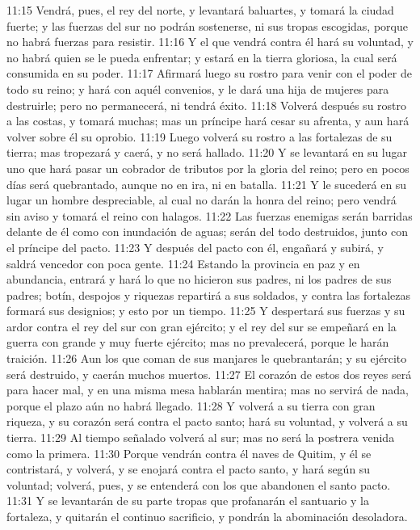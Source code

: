 11:15 Vendrá, pues, el rey del norte, y levantará baluartes, y tomará la ciudad fuerte; y las fuerzas del sur no podrán sostenerse, ni sus tropas escogidas, porque no habrá fuerzas para resistir.  
11:16 Y el que vendrá contra él hará su voluntad, y no habrá quien se le pueda enfrentar; y estará en la tierra gloriosa, la cual será consumida en su poder.  
11:17 Afirmará luego su rostro para venir con el poder de todo su reino; y hará con aquél convenios, y le dará una hija de mujeres para destruirle; pero no permanecerá, ni tendrá éxito.  
11:18 Volverá después su rostro a las costas, y tomará muchas; mas un príncipe hará cesar su afrenta, y aun hará volver sobre él su oprobio.  
11:19 Luego volverá su rostro a las fortalezas de su tierra; mas tropezará y caerá, y no será hallado.  
11:20 Y se levantará en su lugar uno que hará pasar un cobrador de tributos por la gloria del reino; pero en pocos días será quebrantado, aunque no en ira, ni en batalla.  
11:21 Y le sucederá en su lugar un hombre despreciable, al cual no darán la honra del reino; pero vendrá sin aviso y tomará el reino con halagos.  
11:22 Las fuerzas enemigas serán barridas delante de él como con inundación de aguas; serán del todo destruidos, junto con el príncipe del pacto.  
11:23 Y después del pacto con él, engañará y subirá, y saldrá vencedor con poca gente.  
11:24 Estando la provincia en paz y en abundancia, entrará y hará lo que no hicieron sus padres, ni los padres de sus padres; botín, despojos y riquezas repartirá a sus soldados, y contra las fortalezas formará sus designios; y esto por un tiempo.  
11:25 Y despertará sus fuerzas y su ardor contra el rey del sur con gran ejército; y el rey del sur se empeñará en la guerra con grande y muy fuerte ejército; mas no prevalecerá, porque le harán traición.  
11:26 Aun los que coman de sus manjares le quebrantarán; y su ejército será destruido, y caerán muchos muertos.  
11:27 El corazón de estos dos reyes será para hacer mal, y en una misma mesa hablarán mentira; mas no servirá de nada, porque el plazo aún no habrá llegado.  
11:28 Y volverá a su tierra con gran riqueza, y su corazón será contra el pacto santo; hará su voluntad, y volverá a su tierra.  
11:29 Al tiempo señalado volverá al sur; mas no será la postrera venida como la primera.  
11:30 Porque vendrán contra él naves de Quitim, y él se contristará, y volverá, y se enojará contra el pacto santo, y hará según su voluntad; volverá, pues, y se entenderá con los que abandonen el santo pacto.  
11:31 Y se levantarán de su parte tropas que profanarán el santuario y la fortaleza, y quitarán el continuo sacrificio, y pondrán la abominación desoladora. 
